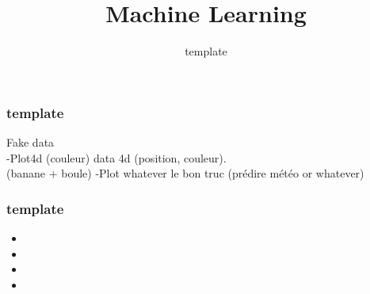 \documentclass{formation}
\title{Machine Learning}
\subtitle{template}
\begin{document}
\maketitle

\begin{frame}
  \frametitle{template}
  Fake data \\
  -Plot4d (couleur) data 4d (position, couleur). \\
    (banane + boule)
  -Plot whatever le bon truc
    (prédire météo or whatever)
\end{frame}

\begin{frame}
  \frametitle{template}
  \begin{minipage}[l]{0.49\linewidth}
  \end{minipage}\hfill
  \begin{minipage}[l]{0.49\linewidth}
    \begin{itemize}
    \item 
    \item {}
    \item 
    \item 
    \end{itemize}
  \end{minipage}\hfill
\end{frame}
\end{document}
